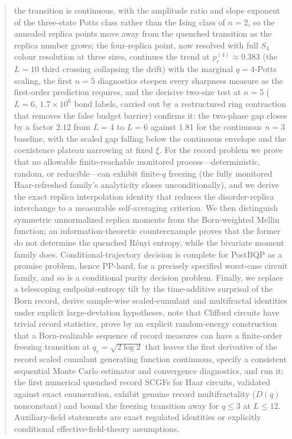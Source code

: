 \documentclass[aps,prx,reprint,superscriptaddress,nobibnotes,longbibliography]{revtex4-2}
\theoremstyle{remark}
\begin{document}
\begin{abstract}
the transition is continuous, with the amplitude ratio and slope exponent of the three-state Potts class rather than the Ising class of $n=2$, so the annealed replica points move away from the quenched transition as the replica number grows; the four-replica point, now resolved with full $S_4$ colour resolution at three sizes, continues the trend at $p_c^{(4)}\approx0.383$ (the $L=10$ third crossing collapsing the drift) with the marginal $q=4$-Potts scaling, the first $n=5$ diagnostics steepen every sharpness measure as the first-order prediction requires, and the decisive two-size test at $n=5$ ($L=6$, $1.7\times10^6$ bond labels, carried out by a restructured ring contraction that removes the false budget barrier) confirms it: the two-phase gap closes by a factor $2.12$ from $L=4$ to $L=6$ against $1.81$ for the continuous $n=3$ baseline, with the scaled gap falling below the continuous envelope and the coexistence plateau narrowing at fixed $\xi$.  For the record problem we prove that no allowable finite-reachable monitored process---deterministic, random, or reducible---can exhibit finite-$q$ freezing (the fully monitored Haar-refreshed family's analyticity closes unconditionally), and we derive the exact replica interpolation identity that reduces the disorder-replica interchange to a measurable self-averaging criterion.  We then distinguish symmetric unnormalized replica moments from the Born-weighted Mellin function; an information-theoretic counterexample proves that the former do not determine the quenched R\'enyi entropy, while the bivariate moment family does.  Conditional-trajectory decision is complete for PostBQP as a promise problem, hence PP-hard, for a precisely specified worst-case circuit family, and so is a conditional purity decision problem.  Finally, we replace a telescoping endpoint-entropy tilt by the time-additive surprisal of the Born record, derive sample-wise scaled-cumulant and multifractal identities under explicit large-deviation hypotheses, note that Clifford circuits have trivial record statistics, prove by an explicit random-energy construction that a Born-realizable sequence of record measures can have a finite-order freezing transition at $q_c=\sqrt{2\log2}$ that leaves the first derivative of the record scaled cumulant generating function continuous, specify a consistent sequential Monte Carlo estimator and convergence diagnostics, and run it: the first numerical quenched record SCGFs for Haar circuits, validated against exact enumeration, exhibit genuine record multifractality ($D(q)$ nonconstant) and bound the freezing transition away for $q\le3$ at $L\le12$.  Auxiliary-field statements are exact regulated identities or explicitly conditional effective-field-theory assumptions.
\end{abstract}
\end{document}
